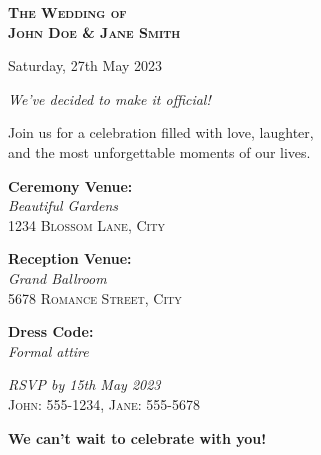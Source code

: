\documentclass{article}
\begin{document}
\pagestyle{empty}


\begin{center}
  {\Huge\bfseries\scshape The Wedding of\\[0.5cm] John Doe \& Jane Smith\\}
  \vspace{1cm}
  
  {\Large Saturday, 27th May 2023\\}
  \vspace{0.5cm}
  
  {\Large\itshape We've decided to make it official!\\}
  \vspace{1cm}
  
  {\large Join us for a celebration filled with love, laughter,\\ and the most unforgettable moments of our lives.\\}
  \vspace{0.5cm}
  
  {\large\bfseries Ceremony Venue:\\}
  {\Large\itshape Beautiful Gardens\\}
  {\large\scshape 1234 Blossom Lane, City\\}
  \vspace{0.5cm}
  
  {\large\bfseries Reception Venue:\\}
  {\Large\itshape Grand Ballroom\\}
  {\large\scshape 5678 Romance Street, City\\}
  \vspace{0.5cm}
  
  {\large\bfseries Dress Code:\\}
  {\Large\itshape Formal attire\\}
  \vspace{1cm}
  
  {\Large\itshape RSVP by 15th May 2023\\}
  {\Large\scshape John: 555-1234, Jane: 555-5678\\}
  \vspace{0.5cm}
  
  {\Large\bfseries We can't wait to celebrate with you!\\}
  \vspace{1cm}
  
\end{center}
\end{document}
